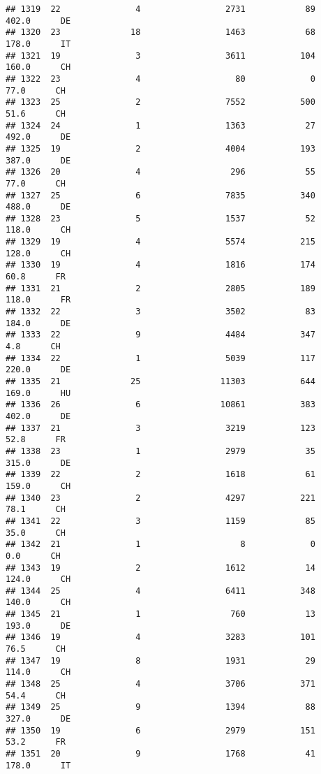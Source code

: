 \documentclass[
]{article}
\begin{document}
\begin{verbatim}
## 1319  22               4                 2731            89    402.0      DE
## 1320  23              18                 1463            68    178.0      IT
## 1321  19               3                 3611           104    160.0      CH
## 1322  23               4                   80             0     77.0      CH
## 1323  25               2                 7552           500     51.6      CH
## 1324  24               1                 1363            27    492.0      DE
## 1325  19               2                 4004           193    387.0      DE
## 1326  20               4                  296            55     77.0      CH
## 1327  25               6                 7835           340    488.0      DE
## 1328  23               5                 1537            52    118.0      CH
## 1329  19               4                 5574           215    128.0      CH
## 1330  19               4                 1816           174     60.8      FR
## 1331  21               2                 2805           189    118.0      FR
## 1332  22               3                 3502            83    184.0      DE
## 1333  22               9                 4484           347      4.8      CH
## 1334  22               1                 5039           117    220.0      DE
## 1335  21              25                11303           644    169.0      HU
## 1336  26               6                10861           383    402.0      DE
## 1337  21               3                 3219           123     52.8      FR
## 1338  23               1                 2979            35    315.0      DE
## 1339  22               2                 1618            61    159.0      CH
## 1340  23               2                 4297           221     78.1      CH
## 1341  22               3                 1159            85     35.0      CH
## 1342  21               1                    8             0      0.0      CH
## 1343  19               2                 1612            14    124.0      CH
## 1344  25               4                 6411           348    140.0      CH
## 1345  21               1                  760            13    193.0      DE
## 1346  19               4                 3283           101     76.5      CH
## 1347  19               8                 1931            29    114.0      CH
## 1348  25               4                 3706           371     54.4      CH
## 1349  25               9                 1394            88    327.0      DE
## 1350  19               6                 2979           151     53.2      FR
## 1351  20               9                 1768            41    178.0      IT

\end{verbatim}
\end{document}
